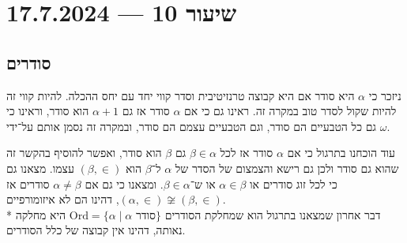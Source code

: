 \section{שיעור 10 --- 17.7.2024}
\subsection{סודרים}
ניזכר כי $\alpha$ היא סודר אם היא קבוצה טרנזיטיבית וסדר קווי יחד עם יחס ההכלה.
להיות קווי זה להיות שקול לסדר טוב במקרה זה.
ראינו גם כי אם $\alpha$ סודר אז גם $\alpha + 1$ הוא סודר, וראינו כי גם כל הטבעיים הם סודר, וגם הטבעיים עצמם הם סודר, ובמקרה זה נסמן אותם על־ידי $\omega$.

עוד הוכחנו בתרגול כי אם $\alpha$ סודר אז לכל $\beta \in \alpha$ גם $\beta$ הוא סודר, ואפשר להוסיף בהקשר זה שהוא גם סודר ולכן גם רישא והצמצום של הסדר של $\alpha$ ל־$\beta$ הוא $(\beta, \in)$ עצמו.
מצאנו גם כי לכל זוג סודרים או $\alpha \in \beta$ או ש־$\beta \in \alpha$.
ומצאנו כי גם אם $\alpha \ne \beta$ סודרים אז $(\alpha, \in) \not\cong (\beta, \in)$, דהינו הם לא איזומורפיים. \\*
דבר אחרון שמצאנו בתרגול הוא שמחלקת הסודרים $\text{Ord} = \{ \alpha \mid \alpha \text{ סודר} \}$ היא מחלקה נאותה, דהינו אין קבוצה של כלל הסודרים.

